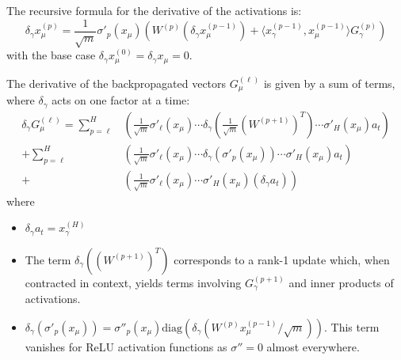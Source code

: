 \documentclass[11pt,a4paper]{article}
\theoremstyle{definition}
\begin{document}
The recursive formula for the derivative of the activations is:
\begin{equation}
\delta_\gamma x^{(p)}_\mu = \frac{1}{\sqrt{m}} \sigma'_{p}(x_\mu) \left( W^{(p)} (\delta_\gamma x^{(p-1)}_\mu) + \langle x^{(p-1)}_\gamma, x^{(p-1)}_\mu \rangle G^{(p)}_\gamma \right)
\end{equation}
with the base case $\delta_\gamma x^{(0)}_\mu = \delta_\gamma x_\mu = 0$.

The derivative of the backpropagated vectors $G^{(\ell)}_\mu$ is given by a sum of terms, where $\delta_\gamma$ acts on one factor at a time:
\begin{align}
\delta_\gamma G^{(\ell)}_\mu = \sum_{p=\ell}^{H} & \left( \frac{1}{\sqrt{m}}\sigma'_\ell(x_\mu) \cdots \delta_\gamma(\frac{1}{\sqrt{m}}(W^{(p+1)})^T) \cdots \sigma'_H(x_\mu) a_t \right) \\
+ \sum_{p=\ell}^{H} & \left( \frac{1}{\sqrt{m}}\sigma'_\ell(x_\mu) \cdots \delta_\gamma(\sigma'_{p}(x_\mu)) \cdots \sigma'_H(x_\mu) a_t \right) \\
+ & \left( \frac{1}{\sqrt{m}}\sigma'_\ell(x_\mu) \cdots \sigma'_H(x_\mu) (\delta_\gamma a_t) \right)
\end{align}
where
\begin{itemize}
    \item $\delta_\gamma a_t = x^{(H)}_\gamma$
    \item The term $\delta_\gamma((W^{(p+1)})^T)$ corresponds to a rank-1 update which, when contracted in context, yields terms involving $G^{(p+1)}_\gamma$ and inner products of activations.
    \item $\delta_\gamma(\sigma'_{p}(x_\mu)) = \sigma''_{p}(x_\mu) \text{diag}(\delta_\gamma(W^{(p)}x^{(p-1)}_\mu/\sqrt{m}))$. This term vanishes for ReLU activation functions as $\sigma''=0$ almost everywhere.
\end{itemize}
\end{document}
